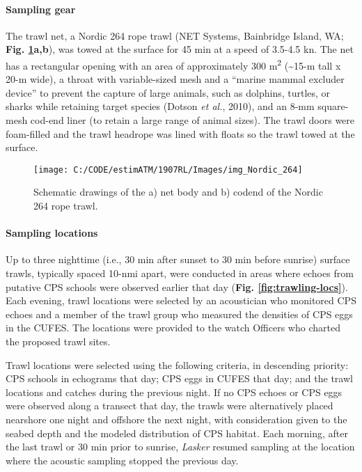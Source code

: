 \documentclass[]{article}
\let\oldparagraph\paragraph
\renewcommand{\paragraph}[1]{\oldparagraph{#1}\mbox{}}
\begin{document}
\hypertarget{methods-trawl-gear}{%
\paragraph{Sampling gear}\label{methods-trawl-gear}}

The trawl net, a Nordic 264 rope trawl (NET Systems, Bainbridge Island, WA; \textbf{Fig. \ref{fig:trawl-diagrams}a,b}), was towed at the surface for 45 min at a speed of 3.5-4.5 kn. The net has a rectangular opening with an area of approximately 300 m\textsuperscript{2} (\textasciitilde15-m tall x 20-m wide), a throat with variable-sized mesh and a ``marine mammal excluder device'' to prevent the capture of large animals, such as dolphins, turtles, or sharks while retaining target species (Dotson \emph{et al.}, 2010), and an 8-mm square-mesh cod-end liner (to retain a large range of animal sizes). The trawl doors were foam-filled and the trawl headrope was lined with floats so the trawl towed at the surface.

\newpage



\begin{figure}[H]

{\centering \texttt{[image: C:/CODE/estimATM/1907RL/Images/img\_Nordic\_264]} 

}

\caption{Schematic drawings of the a) net body and b) codend of the Nordic 264 rope trawl.}\label{fig:trawl-diagrams}
\end{figure}

\newpage

\hypertarget{methods-trawl-locations}{%
\paragraph{Sampling locations}\label{methods-trawl-locations}}

Up to three nighttime (i.e., 30 min after sunset to 30 min before sunrise) surface trawls, typically spaced 10-nmi apart, were conducted in areas where echoes from putative CPS schools were observed earlier that day (\textbf{Fig. \ref{fig:trawling-locs}}). Each evening, trawl locations were selected by an acoustician who monitored CPS echoes and a member of the trawl group who measured the densities of CPS eggs in the CUFES. The locations were provided to the watch Officers who charted the proposed trawl sites.

Trawl locations were selected using the following criteria, in descending priority: CPS schools in echograms that day; CPS eggs in CUFES that day; and the trawl locations and catches during the previous night. If no CPS echoes or CPS eggs were observed along a transect that day, the trawls were alternatively placed nearshore one night and offshore the next night, with consideration given to the seabed depth and the modeled distribution of CPS habitat. Each morning, after the last trawl or 30 min prior to sunrise, \emph{Lasker} resumed sampling at the location where the acoustic sampling stopped the previous day.
\end{document}

